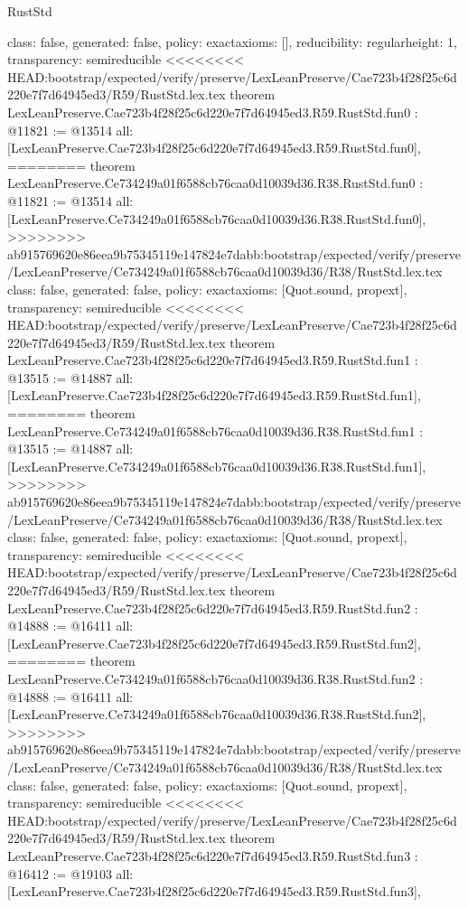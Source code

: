 \begin{lexlean}{RustStd}
\begin{coremodule}
{\begin{coremodule}
{{{  class: false,
  generated: false,
  policy: exact{axioms: []},
  reducibility: regular{height: 1},
  transparency: semireducible
}
<<<<<<<< HEAD:bootstrap/expected/verify/preserve/LexLeanPreserve/Cae723b4f28f25c6d220e7f7d64945ed3/R59/RustStd.lex.tex
theorem LexLeanPreserve.Cae723b4f28f25c6d220e7f7d64945ed3.R59.RustStd.fun0 : @11821 := @13514 {
  all: [LexLeanPreserve.Cae723b4f28f25c6d220e7f7d64945ed3.R59.RustStd.fun0],
========
theorem LexLeanPreserve.Ce734249a01f6588cb76caa0d10039d36.R38.RustStd.fun0 : @11821 := @13514 {
  all: [LexLeanPreserve.Ce734249a01f6588cb76caa0d10039d36.R38.RustStd.fun0],
>>>>>>>> ab915769620e86eea9b75345119e147824e7dabb:bootstrap/expected/verify/preserve/LexLeanPreserve/Ce734249a01f6588cb76caa0d10039d36/R38/RustStd.lex.tex
  class: false,
  generated: false,
  policy: exact{axioms: [Quot.sound, propext]},
  transparency: semireducible
}
<<<<<<<< HEAD:bootstrap/expected/verify/preserve/LexLeanPreserve/Cae723b4f28f25c6d220e7f7d64945ed3/R59/RustStd.lex.tex
theorem LexLeanPreserve.Cae723b4f28f25c6d220e7f7d64945ed3.R59.RustStd.fun1 : @13515 := @14887 {
  all: [LexLeanPreserve.Cae723b4f28f25c6d220e7f7d64945ed3.R59.RustStd.fun1],
========
theorem LexLeanPreserve.Ce734249a01f6588cb76caa0d10039d36.R38.RustStd.fun1 : @13515 := @14887 {
  all: [LexLeanPreserve.Ce734249a01f6588cb76caa0d10039d36.R38.RustStd.fun1],
>>>>>>>> ab915769620e86eea9b75345119e147824e7dabb:bootstrap/expected/verify/preserve/LexLeanPreserve/Ce734249a01f6588cb76caa0d10039d36/R38/RustStd.lex.tex
  class: false,
  generated: false,
  policy: exact{axioms: [Quot.sound, propext]},
  transparency: semireducible
}
<<<<<<<< HEAD:bootstrap/expected/verify/preserve/LexLeanPreserve/Cae723b4f28f25c6d220e7f7d64945ed3/R59/RustStd.lex.tex
theorem LexLeanPreserve.Cae723b4f28f25c6d220e7f7d64945ed3.R59.RustStd.fun2 : @14888 := @16411 {
  all: [LexLeanPreserve.Cae723b4f28f25c6d220e7f7d64945ed3.R59.RustStd.fun2],
========
theorem LexLeanPreserve.Ce734249a01f6588cb76caa0d10039d36.R38.RustStd.fun2 : @14888 := @16411 {
  all: [LexLeanPreserve.Ce734249a01f6588cb76caa0d10039d36.R38.RustStd.fun2],
>>>>>>>> ab915769620e86eea9b75345119e147824e7dabb:bootstrap/expected/verify/preserve/LexLeanPreserve/Ce734249a01f6588cb76caa0d10039d36/R38/RustStd.lex.tex
  class: false,
  generated: false,
  policy: exact{axioms: [Quot.sound, propext]},
  transparency: semireducible
}
<<<<<<<< HEAD:bootstrap/expected/verify/preserve/LexLeanPreserve/Cae723b4f28f25c6d220e7f7d64945ed3/R59/RustStd.lex.tex
theorem LexLeanPreserve.Cae723b4f28f25c6d220e7f7d64945ed3.R59.RustStd.fun3 : @16412 := @19103 {
  all: [LexLeanPreserve.Cae723b4f28f25c6d220e7f7d64945ed3.R59.RustStd.fun3],
}}}}}}
\end{coremodule}}
\end{coremodule}
\end{lexlean}
